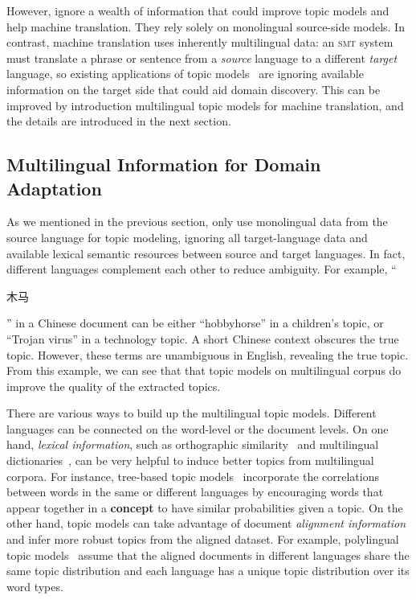 However, \citet{Eidelman-12,su-12,hasler-12} ignore a wealth of information that could improve topic models and help machine translation. They rely solely on monolingual source-side models. In contrast, machine translation uses inherently multilingual data: an \textsc{smt} system must translate a phrase or sentence from a \emph{source} language to a different \emph{target} language, so existing applications of topic models~\citep{Eidelman-12,su-12,hasler-12} are ignoring available information on the target side that could aid domain discovery. This can be improved by introduction multilingual topic models for machine translation, and the details are introduced in the next section.

\subsection{Multilingual Information for Domain Adaptation}
\label{sec:trans-multiling}

As we mentioned in the previous section, \citet{Eidelman-12,su-12,hasler-12} only use monolingual data from the source language for topic modeling, ignoring all target-language data and available lexical semantic resources between source and target languages. In fact, different languages complement each other to reduce ambiguity.  For example, ``\begin{CJK*}{UTF8}{gbsn}木马\end{CJK*}'' in a Chinese document can be either ``hobbyhorse'' in a children's topic, or ``Trojan virus'' in a technology topic.  A short Chinese context obscures the true topic. However, these terms are unambiguous in English, revealing the true topic. From this example, we can see that that topic models on multilingual corpus do improve the quality of the extracted topics.

There are various ways to build up the multilingual topic models. Different languages can be connected on the word-level or the document levels.
On one hand, \emph{lexical information}, such as orthographic similarity~\citep{boyd-graber-09} and multilingual dictionaries~\citep{boyd-graber-10}, can be very helpful to induce better topics from multilingual corpora. For instance, tree-based topic models~\citep{boyd-graber-07,andrzejewski-09,Hu:Boyd-Graber:Satinoff-ur} incorporate the correlations between words in the same or different languages by encouraging words that appear together in a {\bf concept} to have similar probabilities given a topic.
On the other hand, topic models can take advantage of document \emph{alignment information} and infer more robust topics from the aligned dataset. For example, polylingual topic models~\citep{mimno-09} assume that the aligned documents in different languages share the same topic distribution and each language has a unique topic distribution over its word types.

